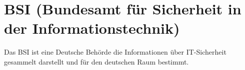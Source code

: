 \section{BSI (Bundesamt für Sicherheit in der Informationstechnik)}

Das BSI ist eine Deutsche Behörde die Informationen über IT-Sicherheit gesammelt darstellt und für den deutschen Raum bestimmt.